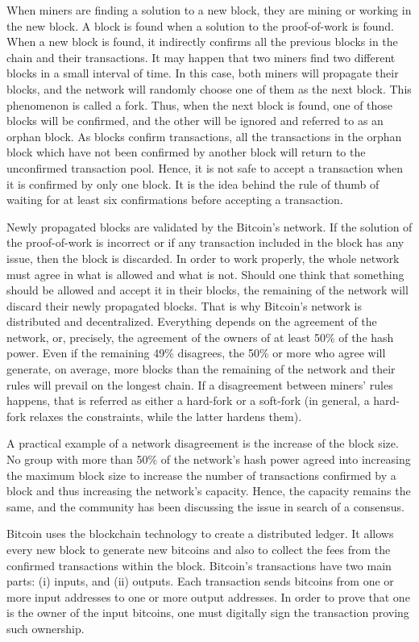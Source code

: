 When miners are finding a solution to a new block, they are mining or working in the new block. A block is found when a solution to the proof-of-work is found. When a new block is found, it indirectly confirms all the previous blocks in the chain and their transactions. It may happen that two miners find two different blocks in a small interval of time. In this case, both miners will propagate their blocks, and the network will randomly choose one of them as the next block. This phenomenon is called a fork. Thus, when the next block is found, one of those blocks will be confirmed, and the other will be ignored and referred to as an orphan block. As blocks confirm transactions, all the transactions in the orphan block which have not been confirmed by another block will return to the unconfirmed transaction pool. Hence, it is not safe to accept a transaction when it is confirmed by only one block. It is the idea behind the rule of thumb of waiting for at least six confirmations before accepting a transaction.

Newly propagated blocks are validated by the Bitcoin's network. If the solution of the proof-of-work is incorrect or if any transaction included in the block has any issue, then the block is discarded. In order to work properly, the whole network must agree in what is allowed and what is not. Should one think that something should be allowed and accept it in their blocks, the remaining of the network will discard their newly propagated blocks. That is why Bitcoin's network is distributed and decentralized. Everything depends on the agreement of the network, or, precisely, the agreement of the owners of at least 50\% of the hash power. Even if the remaining 49\% disagrees, the 50\% or more who agree will generate, on average, more blocks than the remaining of the network and their rules will prevail on the longest chain. If a disagreement between miners' rules happens, that is referred as either a hard-fork or a soft-fork (in general, a hard-fork relaxes the constraints, while the latter hardens them).

A practical example of a network disagreement is the increase of the block size. No group with more than 50\% of the network's hash power agreed into increasing the maximum block size to increase the number of transactions confirmed by a block and thus increasing the network's capacity. Hence, the capacity remains the same, and the community has been discussing the issue in search of a consensus.

Bitcoin uses the blockchain technology to create a distributed ledger. It allows every new block to generate new bitcoins and also to collect the fees from the confirmed transactions within the block. Bitcoin's transactions have two main parts: (i) inputs, and (ii) outputs. Each transaction sends bitcoins from one or more input addresses to one or more output addresses. In order to prove that one is the owner of the input bitcoins, one must digitally sign the transaction proving such ownership.

